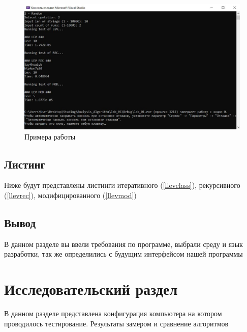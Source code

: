 \documentclass[a4paper, 14pt]{article}
\begin{document}
	\begin{figure}[!h]
		\centering
		\includegraphics[width=0.7\linewidth]{img/screen2}
		\caption[]{Примера работы}
		\label{fig:screen2}
	\end{figure}
	
	
	\subsection{Листинг}
	Ниже будут представлены листинги итеративного (\ref{llevclass}), рекурсивного (\ref{llevrec}), модифицированного (\ref{llevmod})
	
	

	\vspace{5mm}
	
	
	
	\vspace{5mm}
	
	
	
	\subsection{Вывод}
	В данном разделе вы ввели требования по программе, выбрали среду и язык разработки, так же определились с будущим интерфейсом нашей программы
	
	\newpage
	\section{Исследовательский раздел}
	
	В данном разделе представлена конфигурация компьютера на котором проводилось тестирование. Результаты замером и сравнение алгоритмов 
	
\end{document}
